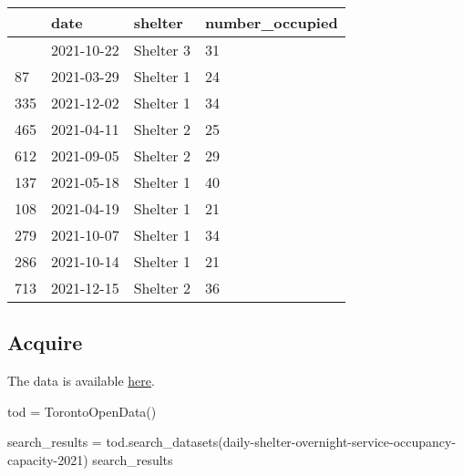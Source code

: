 \documentclass[
  letterpaper,
  DIV=11,
  numbers=noendperiod]{scrreprt}
\newenvironment{Shaded}{\begin{snugshade}}{\end{snugshade}}
\newcommand{\NormalTok}[1]{\textcolor[rgb]{0.00,0.23,0.31}{#1}}
\newcommand{\OperatorTok}[1]{\textcolor[rgb]{0.37,0.37,0.37}{#1}}
\newcommand{\StringTok}[1]{\textcolor[rgb]{0.13,0.47,0.30}{#1}}
\begin{document}
\begin{longtable}[]{@{}llll@{}}
\toprule\noalign{}
& date & shelter & number\_occupied \\
\midrule\noalign{}
\endhead
\bottomrule\noalign{}
\endlastfoot
1024 & 2021-10-22 & Shelter 3 & 31 \\
87 & 2021-03-29 & Shelter 1 & 24 \\
335 & 2021-12-02 & Shelter 1 & 34 \\
465 & 2021-04-11 & Shelter 2 & 25 \\
612 & 2021-09-05 & Shelter 2 & 29 \\
137 & 2021-05-18 & Shelter 1 & 40 \\
108 & 2021-04-19 & Shelter 1 & 21 \\
279 & 2021-10-07 & Shelter 1 & 34 \\
286 & 2021-10-14 & Shelter 1 & 21 \\
713 & 2021-12-15 & Shelter 2 & 36 \\
\end{longtable}

\hypertarget{acquire-1}{%
\subsection{Acquire}\label{acquire-1}}

The data is available
\href{https://open.toronto.ca/dataset/daily-shelter-overnight-service-occupancy-capacity/}{here}.

\begin{Shaded}
\begin{Highlighting}[]
\NormalTok{tod }\OperatorTok{=}\NormalTok{ TorontoOpenData()}

\NormalTok{search\_results }\OperatorTok{=}\NormalTok{ tod.search\_datasets(}\StringTok{\textquotesingle{}daily{-}shelter{-}overnight{-}service{-}occupancy{-}capacity{-}2021\textquotesingle{}}\NormalTok{)}
\NormalTok{search\_results}
\end{Highlighting}
\end{Shaded}
\end{document}

